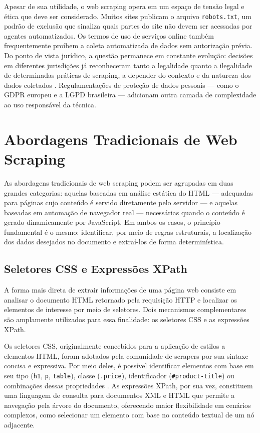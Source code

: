 \documentclass[tcc,capa]{texifsul}
\begin{document}
Apesar de sua utilidade, o web scraping opera em um espaço de tensão legal e ética que deve ser considerado. Muitos sites publicam o arquivo \texttt{robots.txt}, um padrão de exclusão que sinaliza quais partes do site não devem ser acessadas por agentes automatizados. Os termos de uso de serviços online também frequentemente proíbem a coleta automatizada de dados sem autorização prévia. Do ponto de vista jurídico, a questão permanece em constante evolução: decisões em diferentes jurisdições já reconheceram tanto a legalidade quanto a ilegalidade de determinadas práticas de scraping, a depender do contexto e da natureza dos dados coletados \cite{GlezPena2014}. Regulamentações de proteção de dados pessoais — como o GDPR europeu e a LGPD brasileira — adicionam outra camada de complexidade ao uso responsável da técnica.

\section{Abordagens Tradicionais de Web Scraping}

As abordagens tradicionais de web scraping podem ser agrupadas em duas grandes categorias: aquelas baseadas em análise estática do HTML — adequadas para páginas cujo conteúdo é servido diretamente pelo servidor — e aquelas baseadas em automação de navegador real — necessárias quando o conteúdo é gerado dinamicamente por JavaScript. Em ambos os casos, o princípio fundamental é o mesmo: identificar, por meio de regras estruturais, a localização dos dados desejados no documento e extraí-los de forma determinística.

\subsection*{Seletores CSS e Expressões XPath}

A forma mais direta de extrair informações de uma página web consiste em analisar o documento HTML retornado pela requisição HTTP e localizar os elementos de interesse por meio de seletores. Dois mecanismos complementares são amplamente utilizados para essa finalidade: os seletores CSS e as expressões XPath.

Os seletores CSS, originalmente concebidos para a aplicação de estilos a elementos HTML, foram adotados pela comunidade de scrapers por sua sintaxe concisa e expressiva. Por meio deles, é possível identificar elementos com base em seu tipo (\texttt{h1}, \texttt{p}, \texttt{table}), classe (\texttt{.price}), identificador (\texttt{\#product-title}) ou combinações dessas propriedades \cite{Mitchell2018}. As expressões XPath, por sua vez, constituem uma linguagem de consulta para documentos XML e HTML que permite a navegação pela árvore do documento, oferecendo maior flexibilidade em cenários complexos, como selecionar um elemento com base no conteúdo textual de um nó adjacente.
\end{document}
